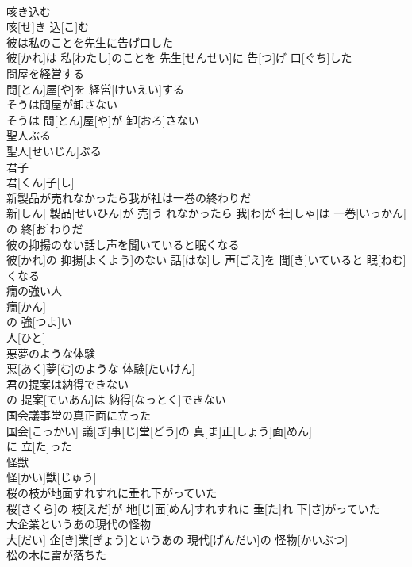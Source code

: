 \documentclass[8pt]{extreport}
\begin{document}
\begin{CJK}{UTF8}{min}
\\	咳き込む	
\\	咳[せ]き 込[こ]む 
\\	彼は私のことを先生に告げ口した	
\\	彼[かれ]は 私[わたし]のことを 先生[せんせい]に 告[つ]げ 口[ぐち]した
\\	問屋を経営する	
\\	問[とん]屋[や]を 経営[けいえい]する
\\	そうは問屋が卸さない	
\\	そうは 問[とん]屋[や]が 卸[おろ]さない
\\	聖人ぶる	
\\	聖人[せいじん]ぶる
\\	君子	
\\	君[くん]子[し]
\\	新製品が売れなかったら我が社は一巻の終わりだ	
\\	新[しん] 製品[せいひん]が 売[う]れなかったら 我[わ]が 社[しゃ]は 一巻[いっかん]の 終[お]わりだ
\\	彼の抑揚のない話し声を聞いていると眠くなる	
\\	彼[かれ]の 抑揚[よくよう]のない 話[はな]し 声[ごえ]を 聞[き]いていると 眠[ねむ]くなる
\\	癇の強い人	
\\	癇[かん]
\\	の 強[つよ]い 
\\	人[ひと]
\\	悪夢のような体験	
\\	悪[あく]夢[む]のような 体験[たいけん]
\\	君の提案は納得できない	
\\	[｟文語｠
\\	君[きみ]の 提案[ていあん]は 納得[なっとく]できない
\\	国会議事堂の真正面に立った	
\\	国会[こっかい] 議[ぎ]事[じ]堂[どう]の 真[ま]正[しょう]面[めん]
\\	に 立[た]った 
\\	怪獣	
\\	怪[かい]獣[じゅう]
\\	桜の枝が地面すれすれに垂れ下がっていた	
\\	桜[さくら]の 枝[えだ]が 地[じ]面[めん]すれすれに 垂[た]れ 下[さ]がっていた
\\	大企業というあの現代の怪物	
\\	大[だい] 企[き]業[ぎょう]というあの 現代[げんだい]の 怪物[かいぶつ]
\\	松の木に雷が落ちた	

\end{CJK}
\end{document}
